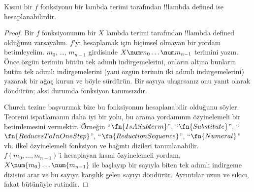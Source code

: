 \documentclass[../../../include/open-logic-section]{subfiles}
\begin{document}

\begin{thm}
Kısmi bir $f$ fonksiyonu bir lambda terimi tarafından !!{lambda defined}
ise hesaplanabilirdir.
\end{thm}

\begin{proof}
Bir $f$ fonksiyonunun bir $X$ lambda terimi tarafından !!{lambda defined}
olduğunu varsayalım. $f$'yi hesaplamak için biçimsel olmayan bir yordam
betimleyelim. $m_0$, \dots, $m_{n-1}$ girdisinde
$X\num m_0\ldots\num m_{n-1}$ terimini yazın. Önce özgün terimin bütün tek
adımlı indirgemelerini, onların altına bunların bütün tek adımlı
indirgemelerini (yani özgün terimin iki adımlı indirgemelerini) yazarak bir
ağaç kurun ve böyle sürdürün. Bir sayıya ulaşırsanız onu yanıt olarak
döndürün; aksi durumda fonksiyon tanımsızdır.

Church tezine başvurmak bize bu fonksiyonun hesaplanabilir olduğunu söyler.
Teoremi ispatlamanın daha iyi bir yolu, bu arama yordamının özyinelemeli bir
betimlemesini vermektir. Örneğin ``$\fn{IsASubterm}$'',
``$\fn{Substitute}$'', ``$\fn{ReducesToInOneStep}$'',
``$\fn{ReductionSequence}$'', ``$\fn{Numeral}$'' vb. ilkel özyinelemeli
fonksiyon ve bağıntı dizileri tanımlanabilir. $f(m_0,\dots,m_{n-1})$'i
hesaplayan kısmi özyinelemeli yordam, $X\num{m_0}\dots\num{m_{n-1}}$ ile
başlayıp bir sayıyla biten tek adımlı indirgeme dizisini arar ve bu sayıya
karşılık gelen sayıyı döndürür. Ayrıntılar uzun ve sıkıcı, fakat bütünüyle
rutindir.
\end{proof}
\end{document}
